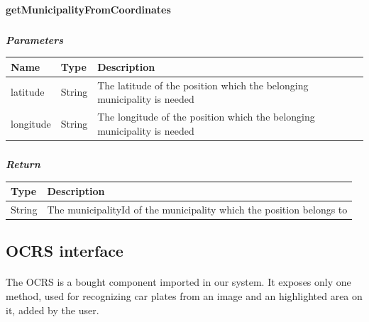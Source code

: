 					\paragraph{}
							\textbf{getMunicipalityFromCoordinates}
							\subparagraph{}
							\vspace{-3mm}
							\textit{\textbf{Parameters}}
							\vspace{-2mm}
								\begin{table}[!h]
									\begin{tabular}{L{0.15\textwidth}L{0.15\textwidth}L{0.5\textwidth}}
										\toprule
										\textbf{Name} & \textbf{Type} & \textbf{Description} \\
										\midrule
								  		latitude & String & The latitude of the position which the belonging municipality is needed \\
								  		longitude & String & The longitude of the position which the belonging municipality is needed \\
								 		\bottomrule
									\end{tabular}
								\end{table}
							\subparagraph{}
							\vspace{-6mm}
								\textit{\textbf{Return}}
								\vspace{-2mm}
									\begin{table}[!h]
									\begin{tabular}{L{0.15\textwidth}L{0.65\textwidth}}
										\toprule
										\textbf{Type} & \textbf{Description} \\
										\midrule
								  		String & The municipalityId of the municipality which the position belongs to \\
								 		\bottomrule
									\end{tabular}
								\end{table}
							
			\subsection{OCRS interface}
				\paragraph{}
					The OCRS is a bought component imported in our system. It exposes only one method, used for recognizing car plates from an image and an highlighted area on it, added by the user.
					
